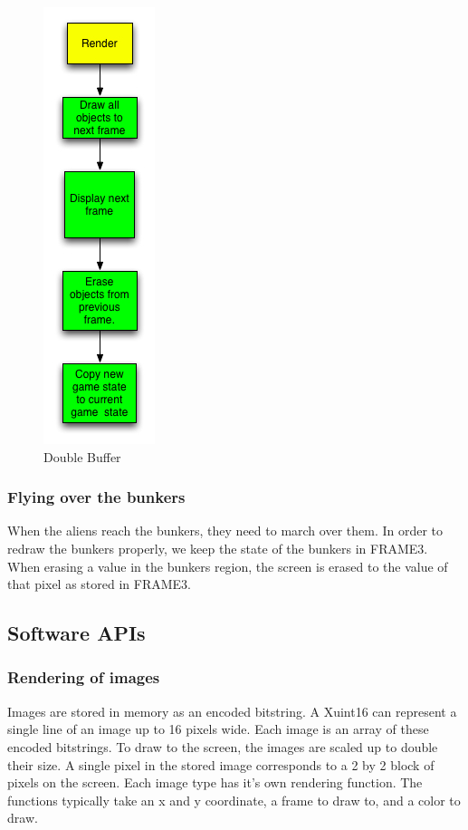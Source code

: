 \documentclass[11pt,letter,oneside]{report}
\begin{document}
\begin{figure}
\centering
\includegraphics[scale=.5]{Render.jpg}
\caption{Double Buffer}
\end{figure}

\subsubsection{Flying over the bunkers}
When the aliens reach the bunkers, they need to march over them.  In order to redraw the bunkers properly, we keep the state of the bunkers in FRAME3.  When erasing a value in the bunkers region, the screen is erased to the value of that pixel as stored in FRAME3.


\subsection{Software APIs}
\subsubsection{Rendering of images}
Images are stored in memory as an encoded bitstring.  A Xuint16 can represent a single line of an image up to 16 pixels wide.  Each image is an array of these encoded bitstrings.  To draw to the screen, the images are scaled up to double their size.  A single pixel in the stored image corresponds to a 2 by 2 block of pixels on the screen. Each image type has it's own rendering function.  The functions typically take an x and y coordinate, a frame to draw to, and a color to draw.
\end{document}

